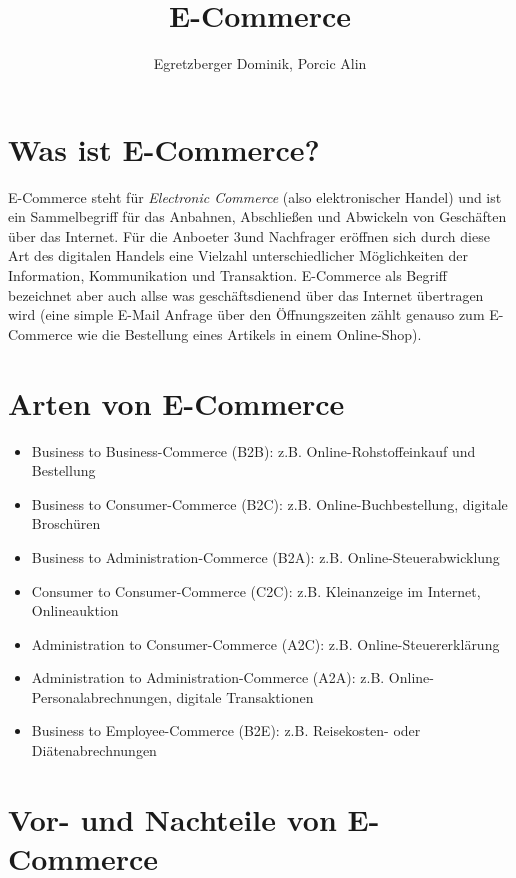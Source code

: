 \documentclass[a4paper]{article}
\author{Egretzberger Dominik, Porcic Alin}
\title{E-Commerce}
\begin{document}
 

\maketitle
\newpage

\tableofcontents
\newpage

\section{Was ist E-Commerce?}

E-Commerce steht für \textit{Electronic Commerce} (also elektronischer Handel) und ist ein Sammelbegriff für das Anbahnen, Abschließen und Abwickeln von Geschäften über das Internet. Für die Anboeter 3und Nachfrager eröffnen sich durch diese Art des digitalen Handels eine Vielzahl unterschiedlicher Möglichkeiten der Information, Kommunikation und Transaktion. E-Commerce als Begriff bezeichnet aber auch allse was geschäftsdienend über das Internet übertragen wird (eine simple E-Mail Anfrage über den Öffnungszeiten zählt genauso zum E-Commerce wie die Bestellung eines Artikels in einem Online-Shop). 

\section{Arten von E-Commerce}

\begin{itemize}
\item Business to Business-Commerce (B2B): z.B. Online-Rohstoffeinkauf und Bestellung
\item Business to Consumer-Commerce (B2C): z.B. Online-Buchbestellung, digitale Broschüren
\item Business to Administration-Commerce (B2A): z.B. Online-Steuerabwicklung
\item Consumer to Consumer-Commerce (C2C): z.B. Kleinanzeige im Internet, Onlineauktion
\item Administration to Consumer-Commerce (A2C): z.B. Online-Steuererklärung
\item Administration to Administration-Commerce (A2A): z.B. Online-Personalabrechnungen, digitale Transaktionen
\item Business to Employee-Commerce (B2E): z.B. Reisekosten- oder Diätenabrechnungen

\end{itemize}

\section{Vor- und Nachteile von E-Commerce}
\end{document}
